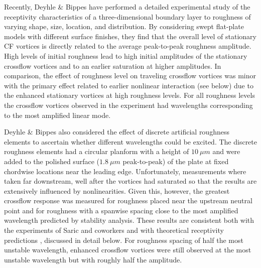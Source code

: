 Recently, Deyhle \& Bippes \cite{DeBi:96} have performed a detailed
experimental study of the receptivity characteristics of a three-dimensional
boundary layer to roughness of varying shape, size, location, and
distribution.  By considering swept flat-plate models with different surface
finishes, they find that the overall level of stationary CF vortices is
directly related to the average peak-to-peak roughness amplitude.  High levels
of initial roughness lead to high initial amplitudes of the stationary
crossflow vortices and to an earlier saturation at higher amplitudes.  In
comparison, the effect of roughness level on traveling crossflow vortices was
minor with the primary effect related to earlier nonlinear interaction (see
below) due to the enhanced stationary vortices at high roughness levels.  For
all roughness levels the crossflow vortices observed in the experiment had
wavelengths corresponding to the most amplified linear mode.

Deyhle \& Bippes \cite{DeBi:96} also considered the effect of discrete
artificial roughness elements to ascertain whether different wavelengths could
be excited.  The discrete roughness elements had a circular planform with a
height of $10~\mu m$ and were added to the polished surface ($1.8~\mu m$
peak-to-peak) of the plate at fixed chordwise locations near the leading edge.
Unfortunately, measurements where taken far downstream, well after the
vortices had saturated so that the results are extensively influenced by
nonlinearities.  Given this, however, the greatest crossflow response was
measured for roughness placed near the upstream neutral point and for
roughness with a spanwise spacing close to the most amplified wavelength
predicted by stability analysis.  These results are consistent both with the
experiments of Saric and coworkers \cite{RaReSa:93,RaReSa:94,ReSaCaCh:96} and
with theoretical receptivity predictions \cite{Crouch:93}, discussed in detail
below.  For roughness spacing of half the most unstable wavelength, enhanced
crossflow vortices were still observed at the most unstable wavelength but
with roughly half the amplitude.
%
%
%
%

